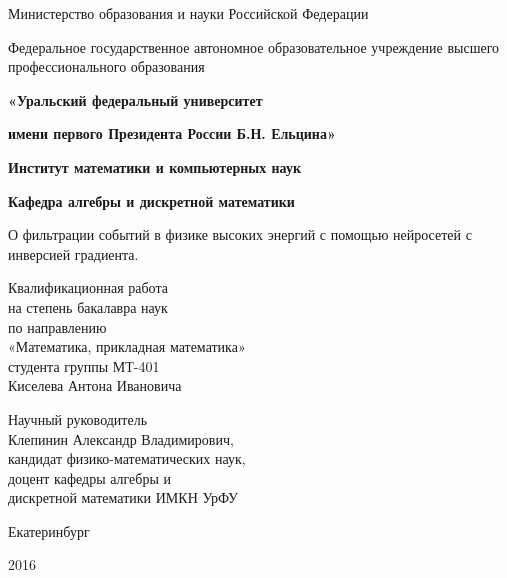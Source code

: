 \documentclass[14pt, a4paper]{extarticle}
\begin{document}
\thispagestyle{empty}

\begin{center}

\scriptsize{
Министерство образования и науки Российской Федерации

Федеральное государственное автономное образовательное учреждение высшего профессионального образования
}

\textbf{«Уральский федеральный университет}

\textbf{имени первого Президента России Б.Н. Ельцина»}

\textbf{\large Институт математики и компьютерных наук}

\textbf{\large Кафедра алгебры и дискретной математики}


\vfill
\vfill

\Large О фильтрации событий в физике высоких энергий с помощью нейросетей с инверсией градиента.

\end{center}

\vfill

\hspace*{0.4\textwidth}
\parbox{0.6\textwidth}{
\noindent
Квалификационная работа\\
на степень бакалавра наук\\
по направлению\\
«Математика, прикладная математика»\\
студента группы МТ-401\\
Киселева Антона Ивановича

\bigskip

\noindent
Научный руководитель\\
Клепинин Александр Владимирович,\\
кандидат физико-математических наук,\\
доцент кафедры алгебры и\\
дискретной математики ИМКН УрФУ
}

\vfill
\vfill

\begin{center}
Екатеринбург

2016
\end{center}

\sloppy

\newpage

\setcounter{page}{1}
\thispagestyle{empty}
\end{document}
